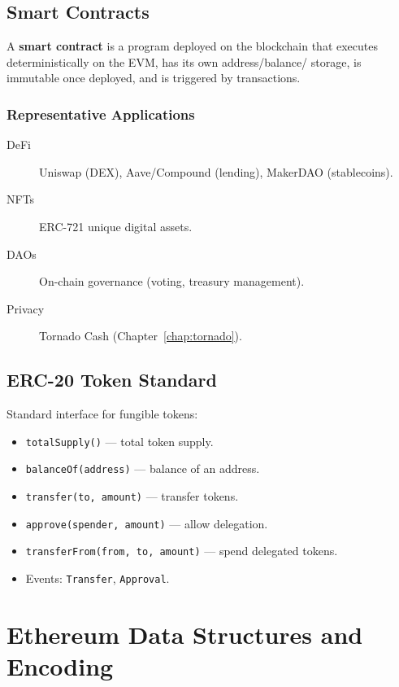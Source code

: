 \documentclass[12pt,a4paper,openany]{book}
\theoremstyle{definition}
\theoremstyle{plain}
\theoremstyle{remark}
\begin{document}
\section{Smart Contracts}

\begin{definitionbox}
  A \textbf{smart contract} is a program deployed on the blockchain that
  executes deterministically on the EVM, has its own address/balance/
  storage, is immutable once deployed, and is triggered by transactions.
\end{definitionbox}

\subsection{Representative Applications}

\begin{description}
  \item[DeFi] Uniswap (DEX), Aave/Compound (lending), MakerDAO (stablecoins).
  \item[NFTs] ERC-721 unique digital assets.
  \item[DAOs] On-chain governance (voting, treasury management).
  \item[Privacy] Tornado Cash (Chapter~\ref{chap:tornado}).
\end{description}

\section{ERC-20 Token Standard}

Standard interface for fungible tokens:
\begin{itemize}
  \item \texttt{totalSupply()} — total token supply.
  \item \texttt{balanceOf(address)} — balance of an address.
  \item \texttt{transfer(to, amount)} — transfer tokens.
  \item \texttt{approve(spender, amount)} — allow delegation.
  \item \texttt{transferFrom(from, to, amount)} — spend delegated tokens.
  \item Events: \texttt{Transfer}, \texttt{Approval}.
\end{itemize}


\chapter{Ethereum Data Structures and Encoding}
\label{chap:ethdata}
\end{document}
